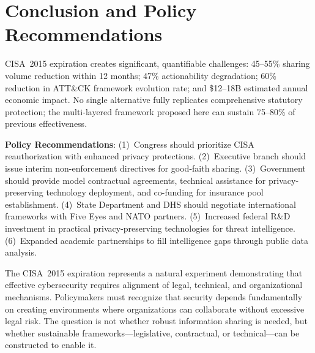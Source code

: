 \documentclass[journal]{IEEEtran}
\begin{document}
\section{Conclusion and Policy Recommendations}

CISA~2015 expiration creates significant, quantifiable challenges: 45--55\% sharing volume reduction within 12 months; 47\% actionability degradation; 60\% reduction in ATT\&CK framework evolution rate; and \$12--18B estimated annual economic impact. No single alternative fully replicates comprehensive statutory protection; the multi-layered framework proposed here can sustain 75--80\% of previous effectiveness.

\textbf{Policy Recommendations}: (1)~Congress should prioritize CISA reauthorization with enhanced privacy protections. (2)~Executive branch should issue interim non-enforcement directives for good-faith sharing. (3)~Government should provide model contractual agreements, technical assistance for privacy-preserving technology deployment, and co-funding for insurance pool establishment. (4)~State Department and DHS should negotiate international frameworks with Five Eyes and NATO partners. (5)~Increased federal R\&D investment in practical privacy-preserving technologies for threat intelligence. (6)~Expanded academic partnerships to fill intelligence gaps through public data analysis.

The CISA~2015 expiration represents a natural experiment demonstrating that effective cybersecurity requires alignment of legal, technical, and organizational mechanisms. Policymakers must recognize that security depends fundamentally on creating environments where organizations can collaborate without excessive legal risk. The question is not whether robust information sharing is needed, but whether sustainable frameworks---legislative, contractual, or technical---can be constructed to enable it.
\end{document}
